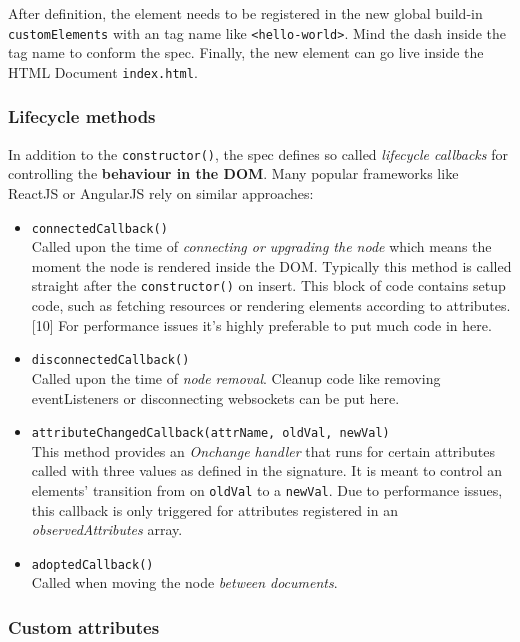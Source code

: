 \documentclass[]{assets/latex/ieee}
\providecommand{\tightlist}{%
  \setlength{\itemsep}{0pt}\setlength{\parskip}{0pt}}
\begin{document}
After definition, the element needs to be registered in the new global
build-in \texttt{customElements} with an tag name like
\texttt{\textless{}hello-world\textgreater{}}. Mind the dash inside the
tag name to conform the spec. Finally, the new element can go live
inside the HTML Document \texttt{index.html}.

\subsubsection{Lifecycle methods}\label{lifecycle-methods}

In addition to the \texttt{constructor()}, the spec defines so called
\emph{lifecycle callbacks} for controlling the \textbf{behaviour in the
DOM}. Many popular frameworks like ReactJS or AngularJS rely on similar
approaches:

\begin{itemize}
\tightlist
\item
  \texttt{connectedCallback()}\\
  Called upon the time of \emph{connecting or upgrading the node} which
  means the moment the node is rendered inside the DOM. Typically this
  method is called straight after the \texttt{constructor()} on insert.
  This block of code contains setup code, such as fetching resources or
  rendering elements according to attributes.{[}10{]} For performance
  issues it's highly preferable to put much code in here.
\item
  \texttt{disconnectedCallback()}\\
  Called upon the time of \emph{node removal}. Cleanup code like
  removing eventListeners or disconnecting websockets can be put here.
\item
  \texttt{attributeChangedCallback(attrName,\ oldVal,\ newVal)}\\
  This method provides an \emph{Onchange handler} that runs for certain
  attributes called with three values as defined in the signature. It is
  meant to control an elements' transition from on \texttt{oldVal} to a
  \texttt{newVal}. Due to performance issues, this callback is only
  triggered for attributes registered in an \emph{observedAttributes}
  array.
\item
  \texttt{adoptedCallback()}\\
  Called when moving the node \emph{between documents}.
\end{itemize}

\subsubsection{Custom attributes}\label{custom-attributes}
\end{document}

